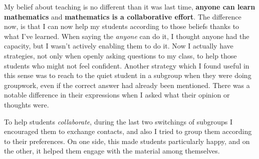 \documentclass[a4paper,12pt,final]{book}
\begin{document}
My belief about teaching is no different than it was last time, \textbf{anyone can learn mathematics} and \textbf{mathematics is a collaborative effort}. The difference now, is that I can now help my students according to those beliefs thanks to what I've learned.
When saying the \emph{anyone} can do it, I thought anyone had the capacity, but I wasn't actively enabling them to do it. 
Now I actually have strategies, not only when openly asking questions to my class, to help those students who might not feel confident.
Another strategy which I found useful in this sense was to reach to the quiet student in a subgroup when they were doing groupwork, even if the correct answer had already been mentioned. There was a notable difference in their expressions when I asked what their opinion or thoughts were.\par 
To help students \emph{collaborate}, during the last two switchings of subgroups I encouraged them to exchange contacts, and also I tried to group them according to their preferences. On one side, this made students particularly happy, and on the other, it helped them engage with the material among themselves. 
\end{document}
